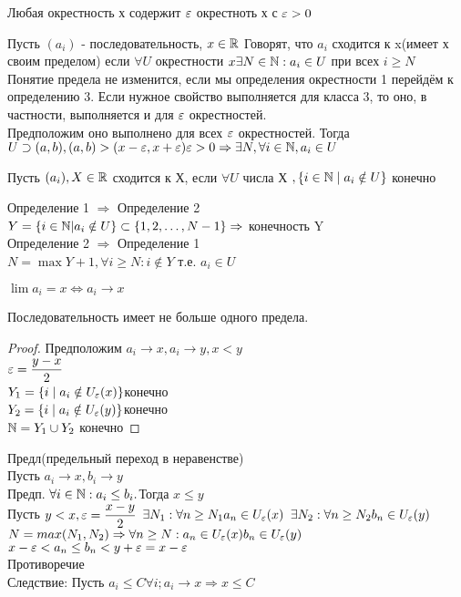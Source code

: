 Любая окрестность х содержит $\varepsilon $ окрестноть х с $ \varepsilon > 0 $ \\
\begin{definition}
	Пусть $(a_i)$ - последовательность, $ x \in \mathbb{R} $ Говорят, что $a_i$ сходится к x(имеет х своим пределом) если $ \forall U $ окрестности $x \exists N \in \mathbb{N} : a_i \in U $ при всех $ i \geq N $ \\
	Понятие предела не изменится, если мы определения окрестности 1 перейдём к определению 3. Если нужное свойство выполняется для класса 3, то оно, в частности, выполняется и для $ \varepsilon $ окрестностей. \\
	Предположим оно выполнено для всех $ \varepsilon $ окрестностей. Тогда $ U \supset(a, b), (a,b) > (x-\varepsilon, x+ \varepsilon) \varepsilon > 0 \Rightarrow \exists N, \forall i \in \mathbb{N}, a_i \in U$  \\
\end{definition}
\begin{definition}
	Пусть $(a_i), X \in \mathbb{R}$ сходится к Х, если $\forall U $ 	числа Х $, \{ i \in \mathbb{N} \mid a_i \notin U \} $ конечно 
\end{definition}
\noindent Определение 1 $\Rightarrow$ Определение 2 \\
$ Y = \{ i \in \mathbb{N} | a_i \notin U \} \subset \{ 1, 2, \dots, N - 1 \} \Rightarrow $ конечность Y \\
Определение 2 $\Rightarrow$ Определение 1 \\ 
$ N = \max Y + 1, \forall i \geq N : i \notin Y$ т.е. $ a_i \in U$
\begin{definition}
	$ \lim a_i = x  \Leftrightarrow a_i \rightarrow x $ \\
\end{definition}

Последовательность имеет не больше одного предела.
\begin{proof}
	Предположим $ a_i \rightarrow x, a_i \rightarrow y, x < y $ \\
	$ \varepsilon = \dfrac{y-x}{2} $ \\
	$Y_1 = \{ i \mid a_i \notin U_{\varepsilon} (x) \} $конечно\\
	$ Y_2 = \{ i \mid a_i \notin U_{\varepsilon} (y) \} $конечно\\
	$ \mathbb{N} = Y_1 \cup Y_2 $ конечно
\end{proof}



Предл(предельный переход в неравенстве) \\
Пусть $ a_i \rightarrow x, b_i \rightarrow y $ \\
Предп. $ \forall i \in \mathbb{N} : a_i \leq b_i. $Тогда $ x\leq y $ \\
Пусть $ y < x, \varepsilon = \dfrac{x-y}{2} $ 
$ \exists N_1 : \forall n \geq N_1 a_n \in U_{\varepsilon}(x) $
$ \exists N_2 : \forall n \geq N_2 b_n \in U_{\varepsilon}(y) $
$  N = max(N_1, N_2) \Rightarrow \forall n \geq N : 
a_n \in U_{\varepsilon}(x)\\
b_n \in U_{\varepsilon}(y)$\\
$ x- \varepsilon <  a_n \leq b_n < y+\varepsilon = x-\varepsilon$\\
Противоречие \\
Следствие: Пусть $ a_i \leq C \forall i; a_i \rightarrow x \Rightarrow x \leq C $\\


